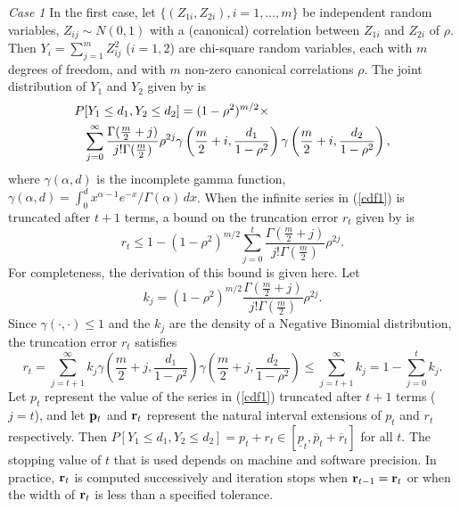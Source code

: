 \documentclass[10pt,letterpaper]{article}
\begin{document}
{\it Case 1}  In the first case, let $\{(Z_{1i}, Z_{2i}), i = 1,\ldots,m\} $ 
be independent
random variables, $Z_{ij} \sim N(0,1)$ with a (canonical) correlation between
$Z_{1i}$ and $ Z_{2i}$ of $\rho$.
Then $Y_i = \sum_{j=1}^m Z_{ij}^2$ ($i=1,2$) are chi-square random variables,
each with $m$ degrees of freedom, and with $m$ non-zero 
canonical correlations $\rho$.
The joint distribution of $Y_1$ and $Y_2$ given by \cite{Krishnaiah80} is
\begin{eqnarray}
\label{cdf1}
\lefteqn{P[Y_1 \leq d_1, Y_2 \leq d_2] = (1-\rho^2)^{m/2}  \times} 
  \hspace{3.5in} \nonumber \\
  \sum_{j=0}^\infty 
  \frac{\Gamma (\frac{m}{2}+j)}{j! \Gamma (\frac{m}{2})} 
  \rho^{2j} 
  \gamma\left( \frac{m}{2}+i , \frac{d_1}{1-\rho^2}\right)
  \gamma\left( \frac{m}{2}+i , \frac{d_2}{1-\rho^2}\right),
\end{eqnarray}
where $\gamma(\alpha, d) $ is the incomplete gamma function, 
$\gamma(\alpha, d) = 
    \int_0^d  x^{\alpha -1} e^{-x}/ \Gamma(\alpha)\, dx$.
When the infinite series in (\ref{cdf1}) is truncated after $t+1$ terms, 
a bound on the truncation error $r_t$ given by 
\cite{Krishnaiah80} is
\begin{equation}
\label{error1}
r_t \leq 1- (1-\rho^2)^{m/2}
  \sum_{j=0}^t \frac{\Gamma (\frac{m}{2}+j)}{ j! \Gamma (\frac{m}{2}) }
  \rho^{2j}.
\end{equation}
For completeness, the derivation of this bound is 
given here.  Let 
$$
k_j =   (1-\rho^2)^{m/2} 
  \frac{\Gamma (\frac{m}{2}+j)} {j! \Gamma (\frac{m}{2})} 
  \rho^{2j}.
$$
Since $\gamma(\cdot,\cdot) \leq 1$ 
and the $k_j$ are the density of a Negative Binomial
distribution, the truncation error $r_t$ satisfies
$$
r_t = \sum_{j=t+1}^\infty k_j 
  \gamma\left( \frac{m}{2}+j , \frac{d_1}{1-\rho^2}\right)
  \gamma\left( \frac{m}{2}+j , \frac{d_2}{1-\rho^2}\right)
  \leq \sum_{j=t+1}^\infty k_j
 = 1 - \sum_{j=0}^t k_j.
$$
Let $p_t$ represent the value of the series in (\ref{cdf1}) truncated
after $t+1$ terms ($j=t$), and let 
${\bf p}_t$ and ${\bf r}_t$ represent the natural interval extensions of 
$p_t$ and $r_t$ respectively.  Then
$P[Y_1 \leq d_1, Y_2 \leq d_2] = p_t + r_t \in
 [ \underline{p}_t , \overline{p}_t + \overline{r}_t]$
 for all $t$.
The stopping value of $t$  that is
used depends on machine and software precision.  In
practice, ${\bf r}_t$ is computed successively and iteration stops when 
${\bf r}_{t-1} = {\bf r}_t$ or when the width of ${\bf r}_{t}$ is less than
a specified tolerance.
\end{document}
